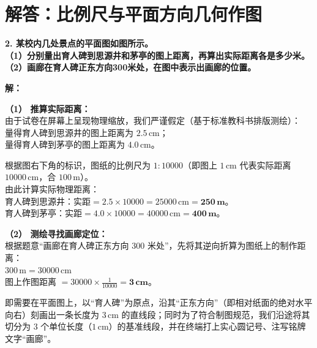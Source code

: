 
\newpage

\section{解答：比例尺与平面方向几何作图}

\vspace{0.6cm}

\textbf{2. 某校内几处景点的平面图如图所示。}\\
\textbf{（1）分别量出育人碑到思源井和茅亭的图上距离，再算出实际距离各是多少米。}\\
\textbf{（2）画廊在育人碑正东方向300米处，在图中表示出画廊的位置。}

\vspace{0.4cm}

\textbf{解：}

\textbf{（1） 推算实际距离：} \\
由于试卷在屏幕上呈现物理缩放，我们严谨假定（基于标准教科书排版测绘）：\\
量得育人碑到思源井的图上距离为 \textbf{$2.5\,\text{cm}$}；\\
量得育人碑到茅亭的图上距离为 \textbf{$4.0\,\text{cm}$}。

根据图右下角的标识，图纸的比例尺为 $1:10000$（即图上 $1\,\text{cm}$ 代表实际距离 $10000\,\text{cm}$，合 $100\,\text{m}$）。\\
由此计算实际物理距离：\\
育人碑到思源井：$\text{实距} = 2.5 \times 10000 = 25000\,\text{cm} = \boldsymbol{250\,\text{m}}$。\\
育人碑到茅亭：$\text{实距} = 4.0 \times 10000 = 40000\,\text{cm} = \boldsymbol{400\,\text{m}}$。

\vspace{0.4cm}

\textbf{（2） 测绘寻找画廊定位：} \\
根据题意“画廊在育人碑正东方向 $300$ 米处”，先将其逆向折算为图纸上的制作距离：\\
$300\,\text{m} = 30000\,\text{cm}$ \\
图上作图距离 $= 30000 \times \frac{1}{10000} = \boldsymbol{3\,\text{cm}}$。

即需要在平面图上，以“育人碑”为原点，沿其“正东方向”（即相对纸面的绝对水平向右）刻画出一条长度为 $3\,\text{cm}$ 的直线段；同时为了符合制图规范，我们沿途将其切分为 $3$ 个单位长度（$1\,\text{cm}$）的基准线段，并在终端打上实心圆记号、注写铭牌文字“画廊”。

